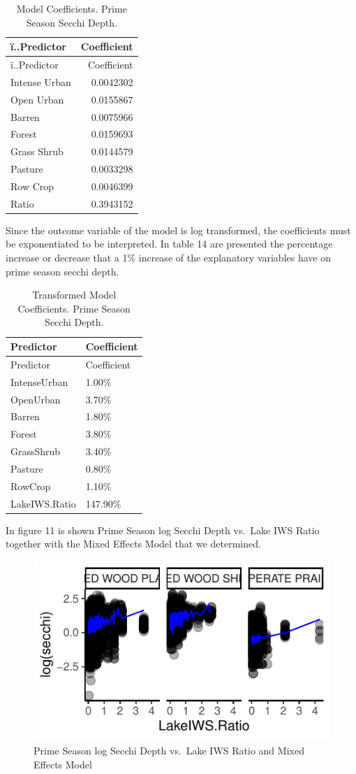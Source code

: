 \documentclass[12pt,]{article}
\begin{document}
\begin{longtable}[]{@{}lr@{}}
\caption{Model Coefficients. Prime Season Secchi Depth.}\tabularnewline
\toprule
ï..Predictor & Coefficient\tabularnewline
\midrule
\endfirsthead
\toprule
ï..Predictor & Coefficient\tabularnewline
\midrule
\endhead
Intense Urban & 0.0042302\tabularnewline
Open Urban & 0.0155867\tabularnewline
Barren & 0.0075966\tabularnewline
Forest & 0.0159693\tabularnewline
Grass Shrub & 0.0144579\tabularnewline
Pasture & 0.0033298\tabularnewline
Row Crop & 0.0046399\tabularnewline
Ratio & 0.3943152\tabularnewline
\bottomrule
\end{longtable}

Since the outcome variable of the model is log transformed, the
coefficients must be exponentiated to be interpreted. In table 14 are
presented the percentage increase or decrease that a 1\% increase of the
explanatory variables have on prime season secchi depth.

\begin{longtable}[]{@{}ll@{}}
\caption{Transformed Model Coefficients. Prime Season Secchi
Depth.}\tabularnewline
\toprule
Predictor & Coefficient\tabularnewline
\midrule
\endfirsthead
\toprule
Predictor & Coefficient\tabularnewline
\midrule
\endhead
IntenseUrban & 1.00\%\tabularnewline
OpenUrban & 3.70\%\tabularnewline
Barren & 1.80\%\tabularnewline
Forest & 3.80\%\tabularnewline
GrassShrub & 3.40\%\tabularnewline
Pasture & 0.80\%\tabularnewline
RowCrop & 1.10\%\tabularnewline
LakeIWS.Ratio & 147.90\%\tabularnewline
\bottomrule
\end{longtable}

In figure 11 is shown Prime Season log Secchi Depth vs.~Lake IWS Ratio
together with the Mixed Effects Model that we determined.

\begin{figure}
\centering
\includegraphics{Bollt_Greif_Raby_Roth_Project_Final_files/figure-latex/unnamed-chunk-28-1.pdf}
\caption{Prime Season log Secchi Depth vs.~Lake IWS Ratio and Mixed
Effects Model}
\end{figure}
\end{document}
